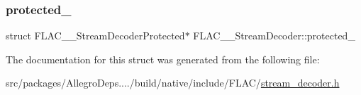 \mbox{\label{struct_f_l_a_c_____stream_decoder_a17beb7a75f968592700bddec512f204d}} 
\subsubsection{\texorpdfstring{protected\+\_\+}{protected\_}}
{\footnotesize\ttfamily struct F\+L\+A\+C\+\_\+\+\_\+\+Stream\+Decoder\+Protected$\ast$ F\+L\+A\+C\+\_\+\+\_\+\+Stream\+Decoder\+::protected\+\_\+}



The documentation for this struct was generated from the following file\+:\begin{DoxyCompactItemize}
\item 
src/packages/\+Allegro\+Deps..../build/native/include/\+F\+L\+A\+C/\hyperlink{stream__decoder_8h}{stream\+\_\+decoder.\+h}\end{DoxyCompactItemize}
